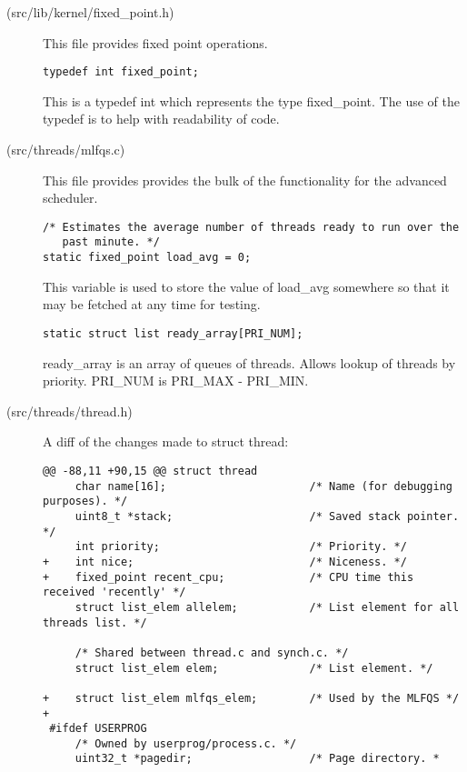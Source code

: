 \begin{description}

\item[(src/lib/kernel/fixed\_point.h)] This file provides fixed point
  operations.

\begin{verbatim}
typedef int fixed_point;
\end{verbatim}
  This is a typedef int which represents the type fixed\_point. The use
  of the typedef is to help with readability of code.

\item[(src/threads/mlfqs.c)] This file provides provides the bulk of the
  functionality for the advanced scheduler.

\begin{verbatim}
/* Estimates the average number of threads ready to run over the
   past minute. */
static fixed_point load_avg = 0;
\end{verbatim}

  This variable is used to store the value of load\_avg somewhere so that it may
  be fetched at any time for testing.

\begin{verbatim}
static struct list ready_array[PRI_NUM];
\end{verbatim}

  ready\_array is an array of queues of threads. Allows lookup of threads by
  priority. PRI\_NUM is PRI\_MAX - PRI\_MIN.

\item[(src/threads/thread.h)]
  A diff of the changes made to struct thread:

\begin{verbatim}
@@ -88,11 +90,15 @@ struct thread
     char name[16];                      /* Name (for debugging purposes). */
     uint8_t *stack;                     /* Saved stack pointer. */
     int priority;                       /* Priority. */
+    int nice;                           /* Niceness. */
+    fixed_point recent_cpu;             /* CPU time this received 'recently' */
     struct list_elem allelem;           /* List element for all threads list. */

     /* Shared between thread.c and synch.c. */
     struct list_elem elem;              /* List element. */

+    struct list_elem mlfqs_elem;        /* Used by the MLFQS */
+
 #ifdef USERPROG
     /* Owned by userprog/process.c. */
     uint32_t *pagedir;                  /* Page directory. *
\end{verbatim}


\end{description}
